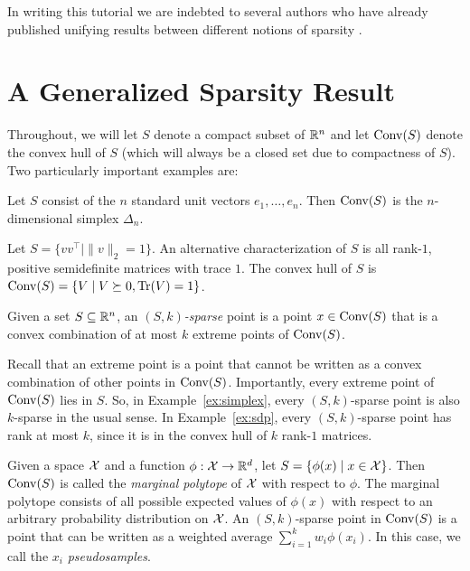\documentclass[paper.tex]{subfiles}
\begin{document}
In writing this tutorial we are indebted to several authors who have already 
published unifying results between different notions of sparsity \citep{?}.

\section{A Generalized Sparsity Result}
Throughout, we will let $S$ denote a 
compact subset of $\mathbb R^n$ and let $\operatorname{Conv}(S)$ denote the convex hull of $S$ 
(which will always be a closed set due to compactness of $S$). Two particularly 
important examples are:
\begin{example}
\label{ex:simplex}
Let $S$ consist of the $n$ standard unit vectors $e_1, \ldots, e_n$. Then 
$\operatorname{Conv}(S)$ is the $n$-dimensional simplex $\Delta_n$.
\end{example}

\begin{example}
\label{ex:sdp}
Let $S = \{vv^{\top} \mid \|v\|_2 = 1\}$. An alternative characterization 
of $S$ is all rank-$1$, positive semidefinite matrices with trace $1$. The 
convex hull of $S$ is $\operatorname{Conv}(S) = \{V \mid V \succeq 0, \operatorname{Tr}(V) = 1\}$.
\end{example}

\begin{definition}
Given a set $S \subseteq \mathbb R^n$, an \emph{$(S, k)$-sparse} point is a point 
$x \in \operatorname{Conv}(S)$ that is a convex combination of at most $k$ extreme 
points of $\operatorname{Conv}(S)$.
\end{definition}

Recall that an extreme point is a point that cannot be written as a convex 
combination of other points in $\operatorname{Conv}(S)$. Importantly, every extreme point 
of $\operatorname{Conv}(S)$ lies in $S$. So, in Example~\ref{ex:simplex}, every 
$(S,k)$-sparse point is also $k$-sparse in the usual sense. In 
Example~\ref{ex:sdp}, every $(S,k)$-sparse point has rank at most $k$, since 
it is in the convex hull of $k$ rank-$1$ matrices.

\begin{example}
\label{ex:marginal-polytope}
Given a space $\mathcal{X}$ and a function $\phi : \mathcal{X} \to \mathbb R^d$, let 
$S = \{\phi(x) \mid x \in \mathcal{X}\}$. Then $\operatorname{Conv}(S)$ is called the 
\emph{marginal polytope} of $\mathcal{X}$ with respect to $\phi$. The 
marginal polytope consists of all possible expected values of 
$\phi(x)$ with respect to an arbitrary probability distribution 
on $\mathcal{X}$. An $(S,k)$-sparse point in $\operatorname{Conv}(S)$ is a point that 
can be written as a weighted average $\sum_{i=1}^k w_i \phi(x_i)$. 
In this case, we call the $x_i$ \emph{pseudosamples}.
\end{example}
\end{document}
